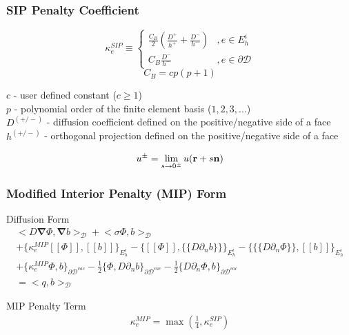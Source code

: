 \documentclass[compress,10pt]{beamer}
\renewcommand{\vec}[1]{\mathbf{#1}}
\begin{document}
\begin{frame}[t]\frametitle{SIP Penalty Coefficient}
\begin{block}{}{
	\begin{equation*}
		\kappa_e^{SIP} \equiv 
		\begin{cases}
		\frac{C_B}{2} \left(  \frac{D^+}{h^+} + \frac{D^-}{h^-}  \right) & , e \in E_h^i \\
		C_B \frac{D^-}{h^-}  & , e \in \partial \mathcal{D}
		\end{cases}
	\end{equation*}}
	\begin{equation*}
		C_B = c p (p+1)
	\end{equation*}
\end{block}
\begin{block}{}
$c$ - user defined constant ($c \geq 1$) \\
$p$ - polynomial order of the finite element basis ($1,2,3,...$) \\
$D^{(+/-)}$ - diffusion coefficient defined on the positive/negative side of a face\\
$h^{(+/-)}$ - orthogonal projection defined on the positive/negative side of a face
\end{block}
\begin{block}{}
	\begin{equation*}
		u^{\pm} = \lim_{s \rightarrow 0^{\pm}} u ({\bf r} + s {\bf n})
	\end{equation*}
\end{block}
\end{frame}
\begin{frame}[t]\frametitle{Modified Interior Penalty (MIP) Form}
	\begin{block}{Diffusion Form}{\footnotesize
		\begin{gather*}
			 \Big<  D \vec{\nabla}  \Phi , \vec{\nabla} b  \Big>_{\mathcal{D}} + \Big<  \sigma   \Phi ,  b  \Big>_{\mathcal{D}}    \\
			+  \Big\{ \kappa_e^{MIP} [\![   \Phi ]\!] , [\![  b ]\!]\Big\}_{E_h^i} - \Big\{  [\![   \Phi ]\!] , \{\!\{  D \partial_n b \}\!\}\Big\}_{E_h^i} -\Big\{ \{\!\{  D \partial_n  \Phi \}\!\} , [\![ b ]\!]\Big\}_{E_h^i} \\
			+ \Big\{ \kappa_e^{MIP}   \Phi ,   b \Big\}_{\partial \mathcal{D}^{vac}} -  \frac{1}{2} \Big\{   \Phi  ,  D \partial_n b \Big\}_{\partial \mathcal{D}^{vac}} -  \frac{1}{2} \Big\{   D 				\partial_n  \Phi ,   b \Big\}_{\partial \mathcal{D}^{vac}}  \\
 = \Big<  q, b  \Big>_{\mathcal{D}}  
        	\end{gather*} }
\end{block}
	\begin{block}{MIP Penalty Term}{\footnotesize
		\begin{align*}
			\kappa_e^{MIP} = \max(\frac{1}{4},  \kappa_e^{SIP})
		\end{align*} }
	\end{block}
\end{frame}
%
%
\end{document}
